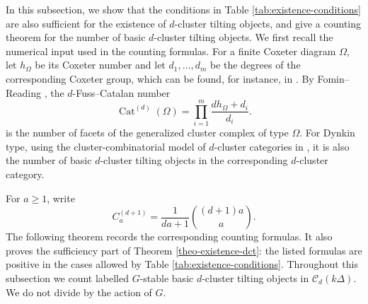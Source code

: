 \documentclass[12pt]{article}
\theoremstyle{plain}
\theoremstyle{definition}
\renewcommand{\geq}{\geqslant}
\begin{document}
In this subsection, we show that the conditions in Table \ref{tab:existence-conditions} are also sufficient for the existence of $d$-cluster tilting objects, and give a counting theorem for the number of basic $d$-cluster tilting objects. We first recall the numerical input used in the counting formulas.  For a
finite Coxeter diagram \(\Omega\), let \(h_{\Omega}\) be its Coxeter number and
let \(d_1,\ldots,d_m\) be the degrees of the corresponding Coxeter group,  which can be
found, for instance, in \cite[Chapter 3]{Humphreys1990}. By Fomin--Reading \cite{FominReading2005}, the
\(d\)-Fuss--Catalan number  
\[\operatorname{Cat}^{(d)}(\Omega)=\prod_{i=1}^m\frac{dh_{\Omega}+d_i}{d_i}.\]
is the number of facets of the
generalized cluster complex of type \(\Omega\).  For Dynkin type, using the
cluster-combinatorial model of \(d\)-cluster categories in
\cite[Corollary 5.8]{Zhu2008}, it is also the number of basic \(d\)-cluster tilting objects in the corresponding $d$-cluster category.

For \(a\geq1\), write
\[C_a^{(d+1)}=\frac{1}{da+1}\binom{(d+1)a}{a}.\]
The following theorem records the corresponding counting formulas.  It also
proves the sufficiency part of Theorem \ref{theo-existence-dct}: the listed
formulas are positive in the cases allowed by Table
\ref{tab:existence-conditions}.
Throughout this subsection we count labelled \(G\)-stable basic
\(d\)-cluster tilting objects in \(\mathcal C_d(k\Delta)\).  We do not divide
by the action of \(G\).
\end{document}
